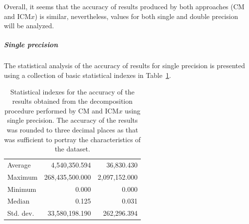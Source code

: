 \begin{figure}[h!]
	\label{Graph:benchmark-results-performance-of-implementations-across-all-matrices-accuracy-single-double-precision}
\end{figure}

Overall, it seems that the accuracy of results produced by both approaches (CM and ICM$ x $) is similar, nevertheless, values for both single and double precision will be analyzed.
\subparagraph{Single precision} The statistical analysis of the accuracy of results for single precision is presented using a collection of basic statistical indexes in Table~\ref{Table:benchmark-results-performance-of-implementations-across-all-matrices-accuracy-statistical-indexes-single-precision}.

\begin{table}[h!]
	\centering
	\renewcommand{\arraystretch}{1.5}
	\begin{tabular}{|>{\footnotesize}l|>{\raggedleft\arraybackslash\footnotesize}r|>{\raggedleft\arraybackslash\footnotesize}r|}
		\hline
		\multicolumn{1}{|>{\centering\footnotesize}c|}{Accuracy index} & \multicolumn{1}{>{\centering\footnotesize}c|}{CM} & \multicolumn{1}{>{\centering\footnotesize}c|}{ICM$ x $} \\
		\hline
		Average   &   4,540,350.594 &    36,830.430 \\
		Maximum   & 268,435,500.000 & 2,097,152.000 \\
		Minimum   &           0.000 &         0.000 \\
		Median    &           0.125 &         0.031 \\
		Std. dev. &  33,580,198.190 &   262,296.394 \\
		\hline
	\end{tabular}
	\caption{Statistical indexes for the accuracy of the results obtained from the decomposition procedure performed by CM and ICM$ x $ using single precision. The accuracy of the results was rounded to three decimal places as that was sufficient to portray the characteristics of the dataset.}
	\label{Table:benchmark-results-performance-of-implementations-across-all-matrices-accuracy-statistical-indexes-single-precision}
\end{table}

